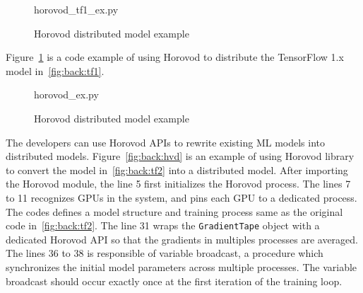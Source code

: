 \begin{figure}[ht!]
 
{horovod_tf1_ex.py}
  \caption{Horovod distributed model example}
\label{fig:back:hvd1} 
\end{figure}

Figure~\ref{fig:back:hvd1} is a code example of using Horovod to distribute
the TensorFlow 1.x model in~\ref{fig:back:tf1}.

\begin{figure}[ht!]
 
{horovod_ex.py}
  \caption{Horovod distributed model example}
\label{fig:back:hvd2} 
\end{figure}


The developers can use Horovod APIs to rewrite existing ML models into
distributed models.
Figure~\ref{fig:back:hvd} is an example of using Horovod library to convert
the model in~\ref{fig:back:tf2} into a distributed model.
After importing the Horovod module, the line 5 first initializes the
Horovod process. 
The lines 7 to 11 recognizes GPUs in the system, and pins each GPU to
a dedicated process.
The codes defines a model structure and training process same as the original
code in~\ref{fig:back:tf2}.
The line 31 wraps the {\tt GradientTape} object with a dedicated 
Horovod API so that the gradients in multiples processes are averaged.
The lines 36 to 38 is responsible of variable broadcast, a procedure which
synchronizes the initial model parameters across multiple processes.
The variable broadcast should occur exactly once at the first iteration of
the training loop.
